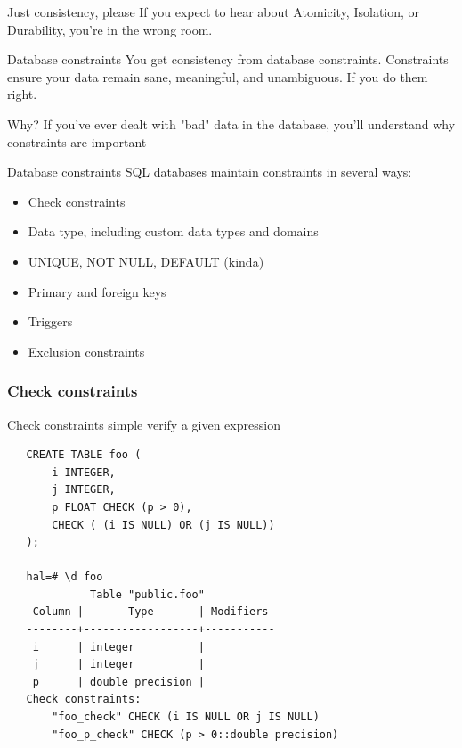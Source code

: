 \documentclass{beamer}
\begin{document}
\begin{frame}{Just consistency, please}
    If you expect to hear about Atomicity, Isolation, or Durability, you're in the wrong room.
\end{frame}

\begin{frame}{Database constraints}
    You get consistency from database constraints. Constraints ensure your data remain sane, meaningful, and unambiguous. If you do them right.
\end{frame}

\begin{frame}
    \begin{block}{Why?}
        If you've ever dealt with "bad" data in the database, you'll understand why constraints are important
    \end{block}
\end{frame}

\begin{frame}{Database constraints}
    SQL databases maintain constraints in several ways:
    \begin{itemize}
        \item Check constraints
        \item Data type, including custom data types and domains
        \item UNIQUE, NOT NULL, DEFAULT (kinda)
        \item Primary and foreign keys
        \item Triggers
        \item Exclusion constraints
    \end{itemize}
\end{frame}

\begin{frame}[fragile]
    \frametitle{Check constraints}
    Check constraints simple verify a given expression
\small
    \begin{verbatim}
   CREATE TABLE foo (
       i INTEGER,
       j INTEGER,
       p FLOAT CHECK (p > 0),
       CHECK ( (i IS NULL) OR (j IS NULL))
   );

   hal=# \d foo
             Table "public.foo"
    Column |       Type       | Modifiers
   --------+------------------+-----------
    i      | integer          |
    j      | integer          |
    p      | double precision |
   Check constraints:
       "foo_check" CHECK (i IS NULL OR j IS NULL)
       "foo_p_check" CHECK (p > 0::double precision)
    \end{verbatim}
\end{frame}
\end{document}
